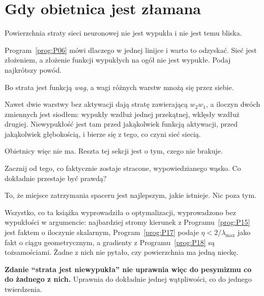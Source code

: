 \section{Gdy obietnica jest złamana}
\label{sec:P19-nonconvex}

\begin{fr}
Powierzchnia straty sieci neuronowej nie jest wypukła i nie jest temu bliska.

Program~\ref{prog:P06} mówi dlaczego w jednej linijce i warto to odzyskać.
Sieć jest złożeniem, a złożenie funkcji wypukłych na ogół nie jest wypukłe.
Podaj najkrótszy powód.
\nextframe
\end{fr}

\begin{fr}
\begin{ansblock}
Bo strata jest funkcją \emph{wag}, a wagi różnych warstw mnożą się przez
siebie.
\end{ansblock}

Nawet dwie warstwy bez aktywacji dają stratę zawierającą $w_2 w_1$, a iloczyn
dwóch zmiennych jest siodłem: wypukły wzdłuż jednej przekątnej, wklęsły wzdłuż
drugiej. Niewypukłość jest tam przed jakąkolwiek funkcją aktywacji, przed
jakąkolwiek głębokością, i bierze się z tego, co czyni sieć siecią.

Obietnicy więc nie ma. Reszta tej sekcji jest o tym, czego nie brakuje.
\end{fr}

\begin{fr}
Zacznij od tego, co faktycznie zostaje stracone, wypowiedzianego wąsko. Co
dokładnie przestaje być prawdą?
\dotline
\nextframe
\end{fr}

\begin{fr}
\begin{ansblock}
To, że miejsce zatrzymania spaceru jest najlepszym, jakie istnieje. Nic poza
tym.
\end{ansblock}

Wszystko, co ta książka wyprowadziła o optymalizacji, wyprowadzono bez
wypukłości w argumencie: najbardziej stromy kierunek z
Programu~\ref{prog:P15} jest faktem o iloczynie skalarnym,
Program~\ref{prog:P17} podaje $\eta < 2/\lambda_{\max}$ jako fakt o ciągu
geometrycznym, a gradienty z Programu~\ref{prog:P18} są tożsamościami. Żadne
z nich nie pytało, czy powierzchnia ma jedną nieckę.

\textbf{Zdanie \enquote{strata jest niewypukła} nie uprawnia więc do
pesymizmu co do żadnego z nich.} Uprawnia do dokładnie jednej wątpliwości, co
do jednego twierdzenia.
\end{fr}


